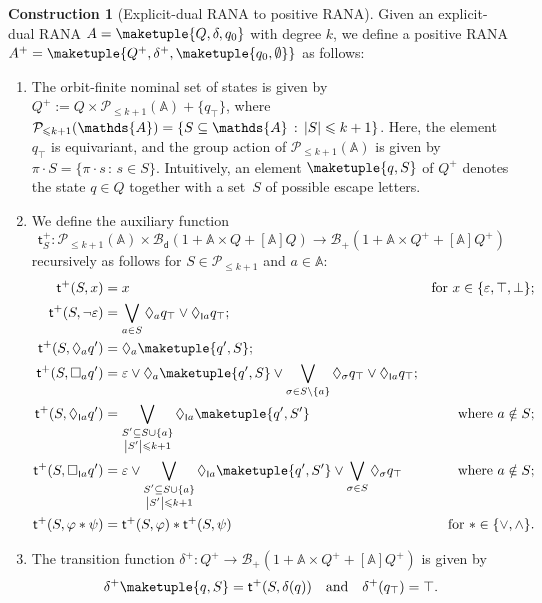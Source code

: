 \documentclass[10pt,a4paper]{amsart}
\theoremstyle{definition}
\newtheorem{construction}[theo]{Construction}
\newcommand{\seq}{\subseteq}
\newcommand{\At}{\mathds{A}}
\newcommand{\card}[1]{\left\vert#1\right\vert}
\newcommand{\trans}{\mathsf{t}}
\newcommand{\allbool}{\mathcal{B}}
\newcommand{\posbool}{\allbool_+}
\newcommand{\pos}[1]{{#1}^{+}}
\newcommand{\dualbool}{\allbool_\mathsf{d}}
\newcommand{\names}{\At}
\newcommand{\Abstr}[2][\names]{[#1]#2}
\newcommand{\pow}{\mathcal{P}}
\newcommand{\pown}[1]{\pow_{\leqslant #1}}
\newcommand{\set}[1]{\{#1\}}
\newcommand{\setw}[2]{\{#1\,:\,#2\}}
\newcommand{\scriptmidmid}{\hspace{0.2ex}{\rule[-0.1ex]{0.6pt}{1.1ex}}\hspace{0.2ex}}
\newcommand{\scriptnew}[1]{{\scriptmidmid}#1}
\let\originalleft\left
\let\originalright\right
\renewcommand{\left}{\mathopen{}\mathclose\bgroup\originalleft}
\renewcommand{\right}{\aftergroup\egroup\originalright}
\begin{document}
\begin{construction}[Explicit-dual RANA to positive RANA]\label{constr:dual2pos}
    Given an explicit-dual RANA $A = \maketuple{Q, \delta, q_0}$ 
    with degree $k$, we define a positive RANA $\pos{A} = \maketuple{\pos{Q},\pos{\delta},\maketuple{q_0,\emptyset}}$ as follows:
    \begin{enumerate}
    \item The orbit-finite nominal set of states is given by
      $\pos{Q} := Q \times \pown{k + 1}(\names) + \set{q_{\top}}$,
      where
      $\pown{k + 1}(\names) = \setw{S \seq \names}{\card{S} \leqslant
        k + 1}$. Here, the element $q_{\top}$ is equivariant, and the
      group action of $\pown{k + 1}(\names)$ is given by
      $\pi\cdot S = \setw{\pi\cdot s}{s\in S}$. Intuitively, an
      element $\maketuple{q, S}$ of $\pos{Q}$ denotes the state
      $q \in Q$ together with a set~$S$ of possible escape letters.
        \item \label{posconstr:impl} We define the auxiliary function
          \[\pos{\trans}_S\colon \pown{k + 1}(\names) \times 
          \dualbool(1 + \names \times Q + \Abstr{Q}) \to \posbool(1 + \names 
          \times \pos{Q} + \Abstr{\pos{Q}})\] recursively
          as follows for $S \in \pown{k + 1}$ and $a\in \At$:
\begin{align*}
\pos{\trans}(S, x) &= x \quad & \text{for  $x \in \set{\varepsilon,\top,\bot}$};\\
\pos{\trans}(S, \neg{\varepsilon}) & = \bigvee_{a \in S} \Diamond_{a} q_{\top} \vee
          \Diamond_{\scriptnew{a}} q_{\top}; & \\
\pos{\trans}(S, \Diamond_a q')
          &= \Diamond_a \maketuple{q',S}; & \\
\pos{\trans}(S, \Box_a q') &= \varepsilon \vee \Diamond_a
          \maketuple{q',S} \vee  \bigvee_{\sigma \in S \setminus \set{a}} \Diamond_\sigma q_{\top} \vee
          \Diamond_{\scriptnew{a}} q_{\top}; & \\
\pos{\trans}(S, \Diamond_{\scriptnew{a}} q') &= \bigvee_{\substack{S' \subseteq
          S \cup \set{a}\\\card{S'} \leqslant k + 1}} \Diamond_{\scriptnew{a}}\maketuple{q',S'} & \text{where $a \notin S$};\\
\pos{\trans}(S, \Box_{\scriptnew{a}} q') &= \varepsilon \vee \bigvee_{\substack{S' \subseteq S
          \cup \set{a}\\\card{S'} \leqslant k + 1}} \Diamond_{\scriptnew{a}}\maketuple{q',S'} \vee
          \bigvee_{\sigma \in S} \Diamond_\sigma q_{\top} & \text{where $a \notin S$}; \\
\pos{\trans}(S, \varphi \ast \psi)
          & = \pos{\trans}(S, \varphi) \ast \pos{\trans}(S, \psi) & \text{for $\ast \in \set{\vee, \wedge}$}.
\end{align*}
        \item The transition function $\pos{\delta}\colon \pos{Q} \to \posbool(1 + \names \times
          \pos{Q} + \Abstr{\pos{Q}})$ is given by
          \[ \pos{\delta}\maketuple{q,S} = \pos{\trans}(S, \delta(q)) \quad\text{and}\quad \pos{\delta}({q_{\top}}) = \top.\]
    \end{enumerate}
\end{construction}
\end{document}
